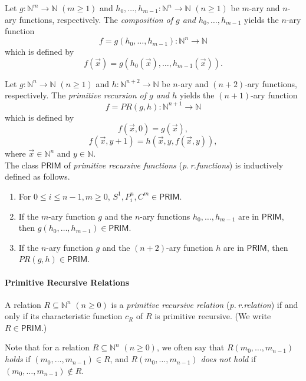 Let $g : \mathbb{N}^m \rightarrow \mathbb{N}$ $(m \ge 1)$ and $h_0, \ldots, h_{m-1} : \mathbb{N}^n \rightarrow \mathbb{N}$ $(n \ge 1)$ be $m$-ary and $n$-ary functions, respectively. The \textit{composition of $g$ and $h_0, \ldots, h_{m-1}$} yields the $n$-ary function
\[f = g(h_0,\ldots, h_{m-1}): \mathbb{N}^n \rightarrow \mathbb{N} \]
which is defined by 
\[f(\overrightarrow{x}) = g(h_0(\overrightarrow{x}), \ldots, h_{m-1}(\overrightarrow{x})). \]

Let $g : \mathbb{N}^n \rightarrow \mathbb{N}$ $(n \ge 1)$ and $h : \mathbb{N}^{n+2} \rightarrow \mathbb{N}$ be $n$-ary and $(n+2)$-ary functions, respectively. The \textit{primitive recursion of $g$ and $h$} yields the $(n+1)$-ary function
\[f= \mathit{PR}(g,h): \mathbb{N}^{n+1} \rightarrow \mathbb{N} \]
which is defined by
\[ f(\overrightarrow{x}, 0) = g(\overrightarrow{x}),\] 
\[ f(\overrightarrow{x}, y+1) = h( \overrightarrow{x}, y, f(\overrightarrow{x},y)), \] 
where $ \overrightarrow{x} \in \mathbb{N}^n $ and $y \in \mathbb{N}$.
\\

The class $\mathsf{PRIM}$ of \textit{primitive recursive functions} (\textit{p.\,r.\@ functions}) is inductively defined as follows.
\begin{enumerate}
\item For $0 \le i \le n-1, m \ge 0$, $S^1, P_i^n, C^m \in \mathsf{PRIM}$.
\item If the $m$-ary function $g$ and the $n$-ary functions $h_0, \ldots, h_{m-1} $ are in $\mathsf{PRIM}$, then $g(h_0, \ldots, h_{m-1}) \in \mathsf{PRIM}$.
\item If the $n$-ary function $g$ and the $(n+2)$-ary function $h$ are in $\mathsf{PRIM}$, then $\mathit{PR}(g,h) \in \mathsf{PRIM}$.
\end{enumerate}


 

\paragraph{Primitive Recursive Relations}

A relation $R \subseteq \mathbb{N}^n$ $(n \ge 0)$ is a \textit{primitive recursive relation} (\textit{p.\,r.\@ relation}) if and only if its characteristic function $c_R$ of $R$ is primitive recursive. (We write $R \in \mathsf{PRIM}$.)


Note that for a relation $R \subseteq \mathbb{N}^n$ $(n \ge 0)$, we often say that \textit{$R(m_0,\ldots, m_{n-1})$ holds} if $(m_0,\ldots, m_{n-1}) \in R$, and \textit{$R(m_0,\ldots, m_{n-1})$ does not hold} if $(m_0,\ldots, m_{n-1}) \notin R$.

